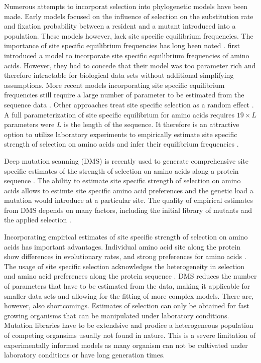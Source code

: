 Numerous attempts to incorporat selection into phylogenetic models have been made.
Early models focused on the influence of selection on the substitution rate and fixation probability between a resident and a mutant introduced into a population\citep{GoldmanAndYang1994, MuseAndGaut1994, thorne1996}.
These models however, lack site specific equilibrium frequencies.
The importance of site specific equilibrium frequencies has long been noted \citep{felsenstein1981, gojobori1983}.
\citet{HalpernAndBruno1998} first introduced a model to incorporate site specific equilibrium frequencies of amino acids.
However, they had to concede that their model was too parameter rich and therefore intractable for biological data sets without additional simplifying assumptions.
More recent models incorporating site specific equilibrium frequencies still require a large number of parameter to be estimated from the sequence data \citep{LartillotAndPhilippe2004,le2008,wang2008,holder2008,wu2013,tamuri2014}.
Other approaches treat site specific selection as a random effect \citep{rodrigue2010,rodrigue2013,rodrigue2014}.
A full parameterization of site specific equilibrium for amino acids requires $19\times L$ parameters were $L$ is the length of the sequence.
It therefore is an attractive option to utilize laboratory experiments to empirically estimate site specific strength of selection on amino acids and infer their equilibrium frequencies \citep{bloom2014, thyagarajan2014, bloom2017}.

Deep mutation scanning (DMS) is recently used to generate comprehensive site specific estimates of the strength of selection on amino acids along a protein sequence \citep{Fowler2014}.
The ability to estimate site specific strength of selection on amino acids allows to estimte site specific amino acid preferences and the genetic load a mutation would introduce at a particular site\citep{bloom2014,firnberg2014,stiffler2016}.
The quality of empirical estimates from DMS depends on many factors, including the initial library of mutants and the applied selection \citep{FirnbergAndOstermeier2012}.

Incorporating empirical estimates of site specific strength of selection on amino acids has important advantages.
Individual amino acid site along the protein show differences in evolutionary rates, and strong preferences for amino acids \citep{HalpernAndBruno1998, ashenberg2013, echave2016}.
The usage of site specific selection acknowledges the heterogeneity in selection and amino acid preferences along the protein sequence \citep{hilton2017}.
DMS reduces the number of parameters that have to be estimated from the data, making it applicable for smaller data sets and allowing for the fitting of more complex models.
There are, however, also shortcomings.
Estimates of selection can only be obtained for fast growing organisms that can be manipulated under laboratory conditions.
Mutation libraries have to be extendsive and prodice a heterogeneous population of competing organsims usually not found in nature.
This is a severe limitation of experimentally informed models as many organism can not be cultivated under laboratory conditions or have long generation times.

